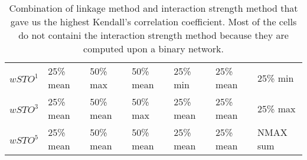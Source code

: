 \begin{table}[ht]
\begin{tabular}{lllllll}
\(\displaystyle wSTO^1 \) &   {\color[HTML]{00D768} 25\% mean} & {\color[HTML]{EF2A00} 50\% max} & {\color[HTML]{0051D7} 50\% mean} & {\color[HTML]{6200D7} 25\% min} & {\color{orange} 25\% mean} & {\color[HTML]{9B9B9B} 25\% min} \\ 
\(\displaystyle wSTO^3 \) &   {\color[HTML]{00D768} 25\% mean} & {\color[HTML]{EF2A00} 50\% mean} & {\color[HTML]{0051D7} 50\% max} & {\color[HTML]{6200D7} 25\% mean} & {\color{orange} 25\% mean} & {\color[HTML]{9B9B9B} 25\% max} \\ 
\(\displaystyle wSTO^5 \) &   {\color[HTML]{00D768} 25\% mean} & {\color[HTML]{EF2A00} 50\% mean} & {\color[HTML]{0051D7} 50\% mean} & {\color[HTML]{6200D7} 25\% mean} & {\color{orange} 25\% mean} & {\color[HTML]{9B9B9B} NMAX sum} \\ 
\end{tabular}
\caption{Combination of linkage method and interaction strength method that gave us the highest Kendall's correlation coefficient. Most of the cells do not containi the interaction strength method because they are computed upon a binary network.}
\end{table}
